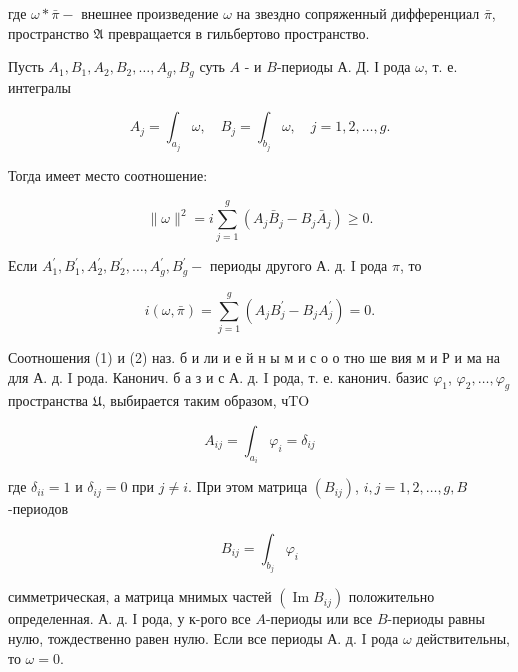 \documentclass[10pt]{article}
\begin{document}
где $\omega * \bar{\pi}-$ внешнее произведение $\omega$ на звездно сопряженный дифференциал $\bar{\pi}$, пространство $\mathfrak{A}$ превращается в гильбертово пространство.



Пусть $A_{1}, B_{1}, A_{2}, B_{2}, \ldots, A_{g}, B_{g}$ суть $A$ - и $B$-периоды А. Д. І рода $\omega$, т. е. интегралы



\[

A_{j}=\int_{a_{j}} \omega, \quad B_{j}=\int_{b_{j}} \omega, \quad j=1,2, \ldots, g .

\]



Тогда имеет место соотношение:



\[

\|\omega\|^{2}=i \sum_{j=1}^{g}\left(A_{j} \bar{B}_{j}-B_{j} \bar{A}_{j}\right) \geqslant 0 .

\]



Если $A_{1}^{\prime}, B_{1}^{\prime}, A_{2}^{\prime}, B_{2}^{\prime}, \ldots, A_{g}^{\prime}, B_{g}^{\prime}-$ периоды другого А. д. I рода $\pi$, то



\[

i(\omega, \bar{\pi})=\sum_{j=1}^{g}\left(A_{j} B_{j}^{\prime}-B_{j} A_{j}^{\prime}\right)=0 .

\]



Соотношения (1) и (2) наз. б и ли и е й н ы м и с о о тно ше вия м и Р и ма на для А. д. I рода. Канонич. б а з и с А. д. I рода, т. е. канонич. базис $\varphi_{1}$, $\varphi_{2}, \ldots, \varphi_{g}$ пространства $\mathfrak{U}$, выбирается таким образом, чTO



\[

A_{i j}=\int_{a_{i}} \varphi_{i}=\delta_{i j}

\]



где $\delta_{i i}=1$ и $\delta_{i j}=0$ при $j \neq i$. При этом матрица $\left(B_{i j}\right)$, $i, j=1,2, \ldots, g, B$-периодов



\[

B_{i j}=\int_{b_{j}} \varphi_{i}

\]



симметрическая, а матрица мнимых частей $\left(\operatorname{Im} B_{i j}\right)$ положительно определенная. А. д. І рода, у к-рого все $A$-периоды или все $B$-периоды равны нулю, тождественно равен нулю. Если все периоды А. д. I рода $\omega$ действительны, то $\omega=0$.
\end{document}
